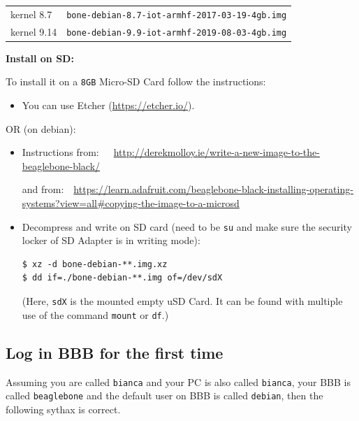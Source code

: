 \documentclass[
	fontsize=10pt
	paper=a4
]{scrartcl}
\begin{document}
\begin{tabular}{ll}
kernel 8.7 & \texttt{bone-debian-8.7-iot-armhf-2017-03-19-4gb.img} \\
kernel 9.14 & \texttt{bone-debian-9.9-iot-armhf-2019-08-03-4gb.img} \\
\end{tabular}




\textbf{Install on SD:}

To install it on a \texttt{8GB} Micro-SD Card follow the instructions:

\begin{itemize}
\item You can use Etcher (\url{https://etcher.io/}).
\end{itemize}

OR (on debian):

\begin{itemize}
\item Instructions from:~~~\url{http://derekmolloy.ie/write-a-new-image-to-the-beaglebone-black/}

and from:~~\url{https://learn.adafruit.com/beaglebone-black-installing-operating-systems?view=all#copying-the-image-to-a-microsd}

\item Decompress and write on SD card (need to be \texttt{su} and make sure the security locker of SD Adapter is in writing mode):
\begin{lstlisting}
$ xz -d bone-debian-**.img.xz
$ dd if=./bone-debian-**.img of=/dev/sdX
\end{lstlisting}

(Here, \texttt{sdX} is the mounted empty uSD Card. It can be found with multiple use of the command \texttt{mount} or \texttt{df}.)

\end{itemize}



\subsection{Log in BBB for the first time}

Assuming you are called \texttt{bianca} and your PC is also called \texttt{bianca},
your BBB is called \texttt{beaglebone} and the default user on BBB is called \texttt{debian}, then the following sythax is correct.
\end{document}
